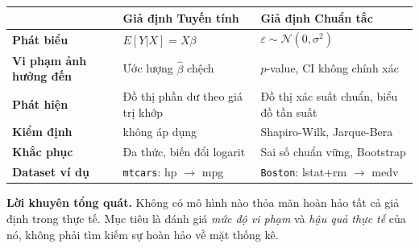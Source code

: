 \documentclass[12pt, a4paper]{article}
\begin{document}
\begin{center}
\begin{tabular}{@{}lll@{}}
\toprule
 & \textbf{Giả định Tuyến tính} & \textbf{Giả định Chuẩn tắc} \\
\midrule
\textbf{Phát biểu} & $E[Y|X] = X\beta$ & $\varepsilon \sim \mathcal{N}(0, \sigma^2)$ \\
\textbf{Vi phạm ảnh hưởng đến} & Ước lượng $\hat{\beta}$ chệch & $p$-value, CI không chính xác \\
\textbf{Phát hiện} & Đồ thị phần dư theo giá trị khớp & Đồ thị xác suất chuẩn, biểu đồ tần suất \\
\textbf{Kiểm định} & không áp dụng & Shapiro-Wilk, Jarque-Bera \\
\textbf{Khắc phục} & Đa thức, biến đổi logarit & Sai số chuẩn vững, Bootstrap \\
\textbf{Dataset ví dụ} & \texttt{mtcars}: hp $\to$ mpg & \texttt{Boston}: lstat+rm $\to$ medv \\
\bottomrule
\end{tabular}
\end{center}

\textbf{Lời khuyên tổng quát.} Không có mô hình nào thỏa mãn hoàn hảo tất cả giả định trong thực tế. Mục tiêu là đánh giá \textit{mức độ vi phạm} và \textit{hậu quả thực tế} của nó, không phải tìm kiếm sự hoàn hảo về mặt thống kê.
\end{document}
